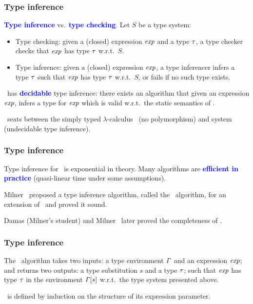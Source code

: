 \documentclass[12pt,red]{beamer}
\newcommand{\cemph}[1]{\textcolor{blue}{\textbf{#1}}}
\begin{document}
\begin{frame}
  \frametitle{Type inference}

  \cemph{Type inference} vs.\ \cemph{type checking}.  Let $S$ be a
  type system:
  \begin{itemize}
  \item Type checking: given a (closed) expression $\mathit{exp}$ and a
    type $\mathit{\tau}$, a type checker checks that $\mathit{exp}$ has type
    $\mathit{\tau}$ w.r.t.\ $S$.
  \item Type inference: given a (closed) expression $\mathit{exp}$, a type
    inferencer infers a type $\mathit{\tau}$ such that $\mathit{exp}$ has type
    $\mathit{\tau}$ w.r.t.\ $S$, or fails if no such type exists.
  \end{itemize}

  \vspace{0.1in}

  \CML\ has \cemph{decidable} type inference: there exists an
  algorithm that given an expression $\mathit{exp}$, infers a type for
  $\mathit{exp}$ which is valid w.r.t.\ the static semantics of \CML.

  \vspace{0.1in}

  \CML\ seats between the simply typed
  $\lambda$-calculus~\cite{Barendregt:1992} (no polymorphism) and
  system~\SYSTF~\cite{Girard:1971,Girard:1972} (undecidable type
  inference).
\end{frame}


\begin{frame}
  \frametitle{Type inference}

  Type inference for \CML\ is exponential in theory.  Many algorithms
  are \cemph{efficient in practice} (quasi-linear time under some
  assumptions).

  \vspace{0.1in}

  Milner~\cite{Milner:1978} proposed a type inference algorithm,
  called the \WALGO\ algorithm, for an extension of \COREML\ and
  proved it sound.

  \vspace{0.1in}

  Damas (Milner's student) and Milner~\cite{Damas+Milner:1982} later
  proved the completeness of \WALGO.
\end{frame}


\begin{frame}
  \frametitle{Type inference}

  The \WALGO\ algorithm takes two inputs: a type environment
  $\mathit{\Gamma}$ and an expression $\mathit{exp}$; and returns two outputs:
  a type substitution $s$ and a type $\mathit{\tau}$; such that $\mathit{exp}$
  has type $\mathit{\tau}$ in the environment $\mathit{\Gamma}[s]$
  w.r.t.\ the type system presented above.

  \vspace{0.1in}

  \WALGO\ is defined by induction on the structure of its expression
  parameter.
\end{frame}
\end{document}

